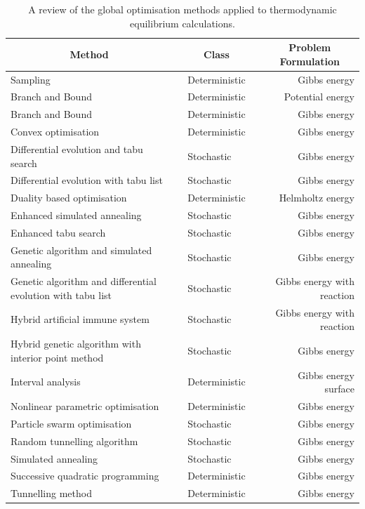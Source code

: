 \begin{table}[htp]
	\caption{A review of the global optimisation methods applied to thermodynamic equilibrium calculations.}
	\centering
	\begin{tabular}{@{}p{} c l c r@{}}
	\toprule
	\multicolumn{1}{c}{\textbf{Method}} &\phantom{abc} & \multicolumn{1}{c}{\textbf{Class}} &\phantom{abc} & \multicolumn{1}{c}{\textbf{Problem Formulation}}\\
	\midrule
	Sampling \cite{Sundman15,Otis:2017ab} && Deterministic && Gibbs energy \\
	Branch and Bound \cite{CHEUNG2002169} && Deterministic && Potential energy \\
	Branch and Bound \cite{Piro16} && Deterministic  && Gibbs energy \\
	Convex optimisation \cite{ROSSI20111226}&& Deterministic && Gibbs energy \\
	Differential evolution and tabu search \cite{SRINIVAS2007760} && Stochastic && Gibbs energy \\
	Differential evolution with tabu list \cite{Srinivas:2007aa} && Stochastic && Gibbs energy \\
	Duality based optimisation \cite{PEREIRA20101} && Deterministic && Helmholtz energy \\
	Enhanced simulated annealing \cite{ZHU20003451} && Stochastic && Gibbs energy \\
	Enhanced tabu search \cite{Teh03} && Stochastic && Gibbs energy \\
	Genetic algorithm and simulated annealing \cite{Rangaiah01} && Stochastic && Gibbs energy \\
	Genetic algorithm and differential evolution with tabu list \cite{Bonilla-Petriciolet:2011aa} && Stochastic && Gibbs energy with reaction \\
	Hybrid artificial immune system \cite{Lin:2007aa} && Stochastic && Gibbs energy with reaction \\
	Hybrid genetic algorithm with interior point method \cite{STAUDT2009585} && Stochastic && Gibbs energy \\
	Interval analysis \cite{Scurto:2003aa} && Deterministic && Gibbs energy surface \\
	Nonlinear parametric optimisation \cite{Chaikunchuensakun:2002aa} && Deterministic && Gibbs energy \\
	Particle swarm optimisation \cite{Bonilla09,Piro16,Myint:2021aa} && Stochastic && Gibbs energy \\
	Random tunnelling algorithm \cite{Srinivas06} && Stochastic && Gibbs energy \\
	Simulated annealing \cite{Bonilla-Petriciolet:2009aa} && Stochastic && Gibbs energy \\
	Successive quadratic programming \cite{LUCIA20002557} && Deterministic && Gibbs energy \\
	Tunnelling method \cite{Nichita02,Nichita:2004aa} && Deterministic && Gibbs energy \\
	\bottomrule
	\end{tabular}
	\label{tab:globalopt}
\end{table}
